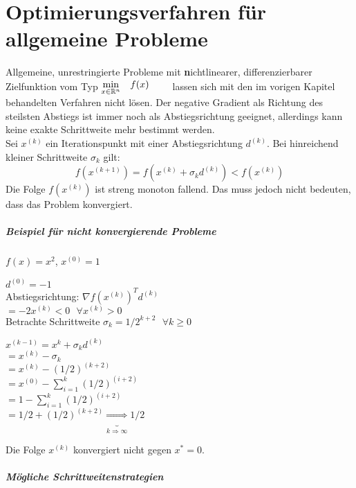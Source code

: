 \chapter{Optimierungsverfahren für allgemeine Probleme}

Allgemeine, unrestringierte Probleme mit \textbf nichtlinearer, differenzierbarer Zielfunktion vom Typ
$
			\begin{aligned}
				\min_{x\in\mathbb R^n}
				& & & f(x) & & &
			\end{aligned} $ lassen sich mit den im vorigen Kapitel behandelten Verfahren nicht lösen. Der negative Gradient als Richtung des steilsten Abstiegs ist immer noch als Abstiegsrichtung geeignet, allerdings kann keine exakte Schrittweite mehr bestimmt werden.\\
Sei $x^{(k)}$ ein Iterationspunkt mit einer Abstiegsrichtung $d^{(k)}$. Bei hinreichend kleiner Schrittweite $\sigma_k$ gilt:
\begin{equation}
	f(x^{(k+1)}) = f(x^{(k)} + \sigma_kd^{(k)}) < f(x^{(k)})
\end{equation}
Die Folge ${f(x^{(k)})}$ ist streng monoton fallend. Das muss jedoch nicht bedeuten, dass das Problem konvergiert.
\paragraph{Beispiel für nicht konvergierende Probleme}

$f(x)= x^2$, $x^{(0)} = 1$


$d^{(0)} = -1$ \\
Abstiegsrichtung: $\nabla f(x^{(k)})^T d^{(k)}$\\
\noindent\hspace*{32mm}%
 $=  -2x^{(k)} < 0 \, \, \, \, \forall x^{(k)} > 0$\\
Betrachte Schrittweite $\sigma_k = 1/2^{k+2} \, \, \, \, \forall k \geq 0$


$x^{(k-1)} = x^k + \sigma_k d^{(k)}$ \\
$= x^{(k)} - \sigma_k$ \\
$= x^{(k)} - (1/2)^{(k+2)}$ \\
$= x^{(0)} - \sum\limits_{i=1}^k (1/2)^{(i+2)}$ \\
$= 1 - \sum\limits_{i=1}^k (1/2)^{(i+2)}$ \\
$= 1/2 + (1/2)^{(k+2)}  \underbrace{\Rightarrow}_{k\Rightarrow \infty} 1/2$


Die Folge $x^{(k)}$ konvergiert nicht gegen $x^{*} = 0$.


\paragraph{Mögliche Schrittweitenstrategien}

